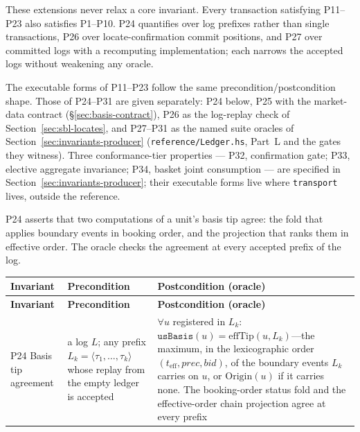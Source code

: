 These extensions never relax a core invariant. Every transaction satisfying P11--P23 also satisfies P1--P10. P24 quantifies over log prefixes rather than single transactions, P26 over locate-confirmation commit positions, and P27 over committed logs with a recomputing implementation; each narrows the accepted logs without weakening any oracle.

The executable forms of P11--P23 follow the same precondition/postcondition shape. Those of P24--P31 are given separately: P24 below, P25 with the market-data contract (\S\ref{sec:basis-contract}), P26 as the log-replay check of Section~\ref{sec:sbl-locates}, and P27--P31 as the named suite oracles of Section~\ref{sec:invariants-producer} (\texttt{reference/Ledger.hs}, Part~L and the gates they witness). Three conformance-tier properties --- P32, confirmation gate; P33, elective aggregate invariance; P34, basket joint consumption --- are specified in Section~\ref{sec:invariants-producer}; their executable forms live where \texttt{transport} lives, outside the reference.

P24 asserts that two computations of a unit's basis tip agree: the fold that applies boundary events in booking order, and the projection that ranks them in effective order. The oracle checks the agreement at every accepted prefix of the log.

\renewcommand{\arraystretch}{1.3}
\begin{center}
\begin{longtable}{@{}p{2.5cm} p{4.4cm} p{5.4cm}@{}}
\toprule
\textbf{Invariant} & \textbf{Precondition} & \textbf{Postcondition (oracle)} \\
\midrule
\endfirsthead
\toprule
\textbf{Invariant} & \textbf{Precondition} & \textbf{Postcondition (oracle)} \\
\midrule
\endhead

P24 Basis tip agreement & a log $L$; any prefix $L_k=\langle\tau_1,\dots,\tau_k\rangle$ whose replay from the empty ledger is accepted & $\forall u$ registered in $L_k$: $\texttt{usBasis}(u)=\mathrm{effTip}(u,L_k)$---the maximum, in the lexicographic order $(t_{\mathrm{eff}},\mathit{prec},\mathit{bid})$, of the boundary events $L_k$ carries on $u$, or $\mathrm{Origin}(u)$ if it carries none. The booking-order status fold and the effective-order chain projection agree at every prefix \\

\bottomrule
\end{longtable}
\end{center}
\renewcommand{\arraystretch}{1.0}

